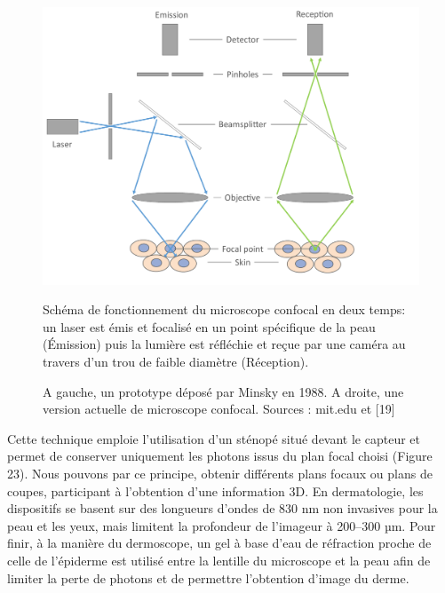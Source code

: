 \begin{figure}[H]
    \begin{center}
        \includegraphics[width=0.6\linewidth]{contents/chapter_2/resources/rcm_principle.pdf}
        \caption{Schéma de fonctionnement du microscope confocal en deux temps: un laser est émis et focalisé en un point spécifique de la peau (Émission) puis la lumière est réfléchie et reçue par une caméra au travers d'un trou de faible diamètre (Réception).}
        \label{fig:rcm}
    \end{center} 
    \caption{A gauche, un prototype déposé par Minsky en 1988. A droite, une version actuelle de microscope confocal. Sources : mit.edu et [19] }
\end{figure}\par

Cette technique emploie l’utilisation d’un sténopé  situé devant le capteur et permet de conserver uniquement les photons issus du plan focal choisi (Figure 23). Nous pouvons par ce principe, obtenir différents plans focaux ou plans de coupes, participant à l’obtention d’une information 3D. En dermatologie, les dispositifs se basent sur des longueurs d’ondes de 830 nm non invasives pour la peau et les yeux, mais limitent la profondeur de l’imageur à 200–300 µm. 
Pour finir, à la manière du dermoscope, un gel à base d’eau de réfraction proche de celle de l’épiderme est utilisé entre la lentille du microscope et la peau afin de limiter la perte de photons et de permettre l’obtention d’image du derme.

